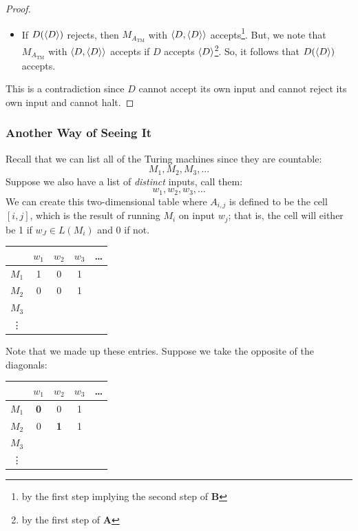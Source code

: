 \documentclass[letterpaper]{article}
\begin{document}
\begin{mdframed}[]
\begin{proof}
\begin{itemize}
            \item If $D(\langle D \rangle)$ rejects, then $M_{A_{\text{TM}}}$ with $\langle D, \langle D \rangle \rangle$ accepts\footnote{by the first step implying the second step of \textbf{B}}. But, we note that $M_{A_{\text{TM}}}$ with $\langle D, \langle D \rangle \rangle$ accepts if $D$ accepts $\langle D \rangle$\footnote{by the first step of \textbf{A}}. So, it follows that $D(\langle D \rangle)$ accepts.  
        \end{itemize}
        This is a contradiction since $D$ cannot accept its own input and cannot reject its own input and cannot halt. 
    \end{proof}
\end{mdframed}

\subsubsection{Another Way of Seeing It}
Recall that we can list all of the Turing machines since they are countable: 
\[M_1, M_2, M_3, \dots\]
Suppose we also have a list of \emph{distinct} inputs, call them: 
\[w_1, w_2, w_3, \dots\]
We can create this two-dimensional table where $A_{i, j}$ is defined to be the cell $[i, j]$, which is the result of running $M_i$ on input $w_j$; that is, the cell will either be 1 if $w_J \in L(M_i)$ and 0 if not.  
\begin{center}
    \begin{tabular}{c|c|c|c|c}
                & $w_1$ & $w_2$ & $w_3$ & \dots \\
        \hline 
        $M_1$   &   1   &   0   &   1   & \\
        \hline 
        $M_2$   &   0   &   0   &   1   & \\
        \hline 
        $M_3$   &       &       &       & \\
        \hline 
        \vdots  &       &       &       &
    \end{tabular}
\end{center}
Note that we made up these entries. Suppose we take the opposite of the diagonals: 
\begin{center}
    \begin{tabular}{c|c|c|c|c}
                & $w_1$ & $w_2$ & $w_3$ & \dots \\
        \hline 
        $M_1$   & \textbf{0} &   0   &   1   & \\
        \hline 
        $M_2$   &   0   & \textbf{1} &   1   & \\
        \hline 
        $M_3$   &       &       &       & \\
        \hline 
        \vdots  &       &       &       &
    \end{tabular}
\end{center}
\end{document}
